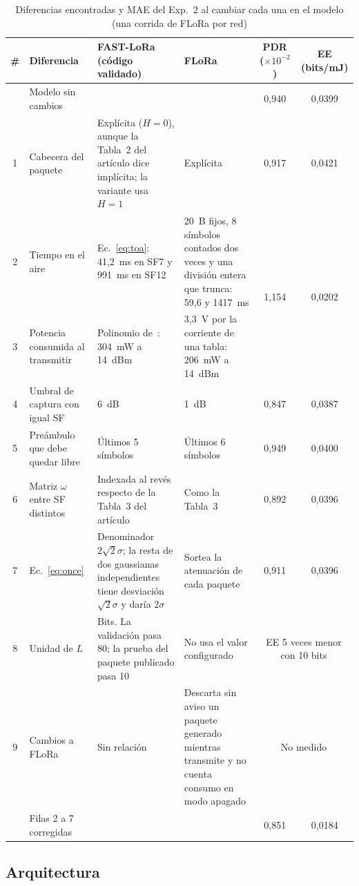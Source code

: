 \documentclass[conference,a4paper]{IEEEtran}
\begin{document}
\begin{table}[t]
\centering
\caption{Diferencias encontradas y MAE del Exp.~2 al cambiar cada una en el modelo (una corrida de FLoRa por red)}
\label{tab:cabos}
\footnotesize
\renewcommand{\arraystretch}{1.12}
\begin{tabular}{@{}c p{3.3cm} p{4.6cm} p{4.6cm} c c@{}}
\toprule
\# & Diferencia & FAST-LoRa (código validado) & FLoRa & PDR ($\times10^{-2}$) & EE (bits/mJ) \\ \midrule
  & Modelo sin cambios & & & 0,940 & 0,0399 \\ \midrule
1 & Cabecera del paquete & Explícita ($H=0$), aunque la Tabla~2 del artículo dice implícita; la variante usa $H=1$ & Explícita & 0,917 & 0,0421 \\
2 & Tiempo en el aire & Ec.~\eqref{eq:toa}: 41,2~ms en SF7 y 991~ms en SF12 & 20~B fijos, 8 símbolos contados dos veces y una división entera que trunca: 59,6 y 1417~ms & \multirow{2}{*}{1,154} & \multirow{2}{*}{0,0202} \\
3 & Potencia consumida al transmitir & Polinomio de~\cite{liando}: 304~mW a 14~dBm & 3,3~V por la corriente de una tabla: 206~mW a 14~dBm & & \\
4 & Umbral de captura con igual SF & 6~dB & 1~dB & 0,847 & 0,0387 \\
5 & Preámbulo que debe quedar libre & Últimos 5 símbolos & Últimos 6 símbolos & 0,949 & 0,0400 \\
6 & Matriz $\omega$ entre SF distintos & Indexada al revés respecto de la Tabla~3 del artículo & Como la Tabla~3 & 0,892 & 0,0396 \\
7 & Ec.~\eqref{eq:once} & Denominador $2\sqrt2\sigma$; la resta de dos gaussianas independientes tiene desviación $\sqrt2\sigma$ y daría $2\sigma$ & Sortea la atenuación de cada paquete & 0,911 & 0,0396 \\
8 & Unidad de $L$ & Bits. La validación pasa 80; la prueba del paquete publicado pasa 10 & No usa el valor configurado & \multicolumn{2}{c}{EE 5 veces menor con 10 bits} \\
9 & Cambios a FLoRa & Sin relación & Descarta sin aviso un paquete generado mientras transmite y no cuenta consumo en modo apagado & \multicolumn{2}{c}{No medido} \\ \midrule
  & Filas 2 a 7 corregidas & & & 0,851 & 0,0184 \\
\bottomrule
\end{tabular}
\end{table}

\subsection{Arquitectura}
\end{document}
